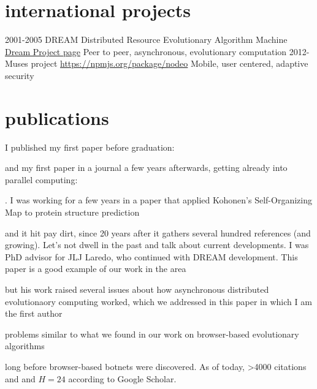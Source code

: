 \documentclass[]{friggeri-jj-cv}
\begin{document}
\section{international projects}

\begin{entrylist}
  \entry
    {2001-2005}
    {{\sf DREAM} Distributed Resource Evolutionary Algorithm Machine}
    {\href{http://www.soc.napier.ac.uk/~benp/dream/dream.htm}{Dream
        Project page}}
    {Peer to peer, asynchronous, evolutionary computation}
  \entry
    {2012-}
    {Muses project}
    {\href{https://musesproject.eu/}{https://npmjs.org/package/nodeo}}
    {Mobile, user centered, adaptive security}
\end{entrylist}

\section{publications}

I published my first paper before graduation: 

\cite{merelo88} 
and my first paper in a journal a few years
afterwards, getting already into parallel computing:

\cite{parallel90}. 
I was working for a few years in a paper that
applied Kohonen's Self-Organizing Map to protein structure prediction

\cite{jjproteng} 
and it hit pay dirt, since 20 years after it gathers
several hundred references (and growing). Let's not dwell in the past
and talk about current developments. I was PhD advisor for JLJ Laredo,
who continued with DREAM development. This paper is a good example of
our work in the area

\cite{evag:gpem}
but his work raised several issues about how asynchronous distributed
evolutionaory computing worked, which we addressed in this paper in
which I am the first author

\cite{jj:2008:PPSN}
problems similar to what we found in our work on browser-based
evolutionary algorithms 

\cite{agajaj}
long before browser-based botnets were discovered. As of today, >4000
citations and and $H=24$ according to Google Scholar.

\end{document}
